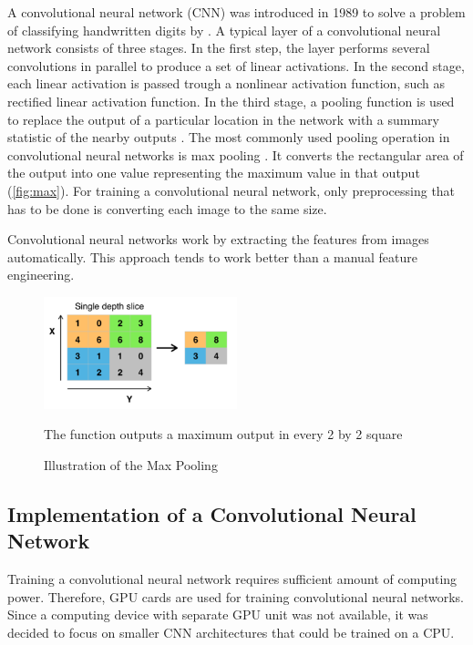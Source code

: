 A convolutional neural network (CNN) was introduced in 1989 to solve a problem of classifying handwritten digits by \cite{lecun}.
A typical layer of a convolutional neural network consists of three stages. In the first step, the layer performs several convolutions in parallel to produce a set of linear activations. In the second stage, each linear activation is passed trough a nonlinear activation function, such as rectified linear activation function. In the third stage, a pooling function is used to replace the output of a particular location in the network with a summary statistic of the nearby outputs \citep{Goodfellow-et-al-2017}. The most commonly used pooling operation in convolutional neural networks is max pooling \citep{max}. It converts the rectangular area of the output into one value representing the maximum value in that output (\autoref{fig:max}). For training a convolutional neural network, only preprocessing that has to be done is converting each image to the same size.

Convolutional neural networks work by extracting the features from images automatically. This approach tends to work better than a manual feature engineering.

\begin{figure}[h]
\centering
\includegraphics[width=0.5\textwidth]{Figures/4/Max_pooling.png}
\caption{Illustration of the Max Pooling}\medskip The function outputs a maximum output in every 2 by 2 square \citep{wiki:Convolutional}
\label{fig:max}
\end{figure}
 

\subsection{Implementation of a Convolutional Neural Network}

Training a convolutional neural network requires sufficient amount of computing power. Therefore,  GPU cards are used for training convolutional neural networks. Since a computing device with separate GPU unit was not available, it was decided to focus on smaller CNN architectures that could be trained on a CPU.

